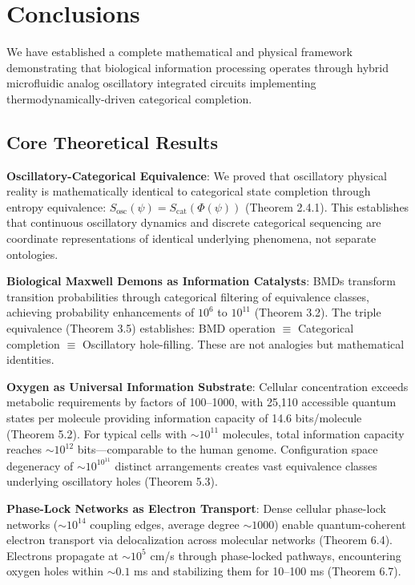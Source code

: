 \documentclass[11pt,a4paper]{article}
\begin{document}

\clearpage

\section{Conclusions}

We have established a complete mathematical and physical framework demonstrating that biological information processing operates through hybrid microfluidic analog oscillatory integrated circuits implementing thermodynamically-driven categorical completion.

\subsection{Core Theoretical Results}

\textbf{Oscillatory-Categorical Equivalence}: We proved that oscillatory physical reality is mathematically identical to categorical state completion through entropy equivalence: $S_{\text{osc}}(\psi) = S_{\text{cat}}(\Phi(\psi))$ (Theorem 2.4.1). This establishes that continuous oscillatory dynamics and discrete categorical sequencing are coordinate representations of identical underlying phenomena, not separate ontologies.

\textbf{Biological Maxwell Demons as Information Catalysts}: BMDs transform transition probabilities through categorical filtering of equivalence classes, achieving probability enhancements of $10^6$ to $10^{11}$ (Theorem 3.2). The triple equivalence (Theorem 3.5) establishes: BMD operation $\equiv$ Categorical completion $\equiv$ Oscillatory hole-filling. These are not analogies but mathematical identities.

\textbf{Oxygen as Universal Information Substrate}: Cellular  concentration exceeds metabolic requirements by factors of 100--1000, with 25,110 accessible quantum states per molecule providing information capacity of 14.6 bits/molecule (Theorem 5.2). For typical cells with $\sim 10^{11}$  molecules, total information capacity reaches $\sim 10^{12}$ bits—comparable to the human genome. Configuration space degeneracy of $\sim 10^{10^{11}}$ distinct arrangements creates vast equivalence classes underlying oscillatory holes (Theorem 5.3).

\textbf{Phase-Lock Networks as Electron Transport}: Dense cellular phase-lock networks ($\sim 10^{14}$ coupling edges, average degree $\sim 1000$) enable quantum-coherent electron transport via delocalization across molecular networks (Theorem 6.4). Electrons propagate at $\sim 10^5$ cm/s through phase-locked pathways, encountering oxygen holes within $\sim 0.1$ ms and stabilizing them for 10--100 ms (Theorem 6.7).
\end{document}
